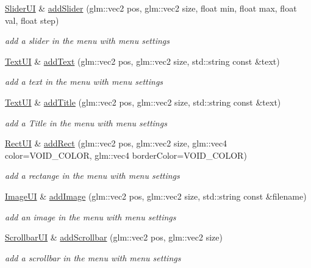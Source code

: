 \begin{DoxyCompactItemize}
\hyperlink{class_slider_u_i}{Slider\+UI} \& \hyperlink{class_a_scene_menu_ad526697a433c9f8e627eb6c147a5bd20}{add\+Slider} (glm\+::vec2 pos, glm\+::vec2 size, float min, float max, float val, float step)
\begin{DoxyCompactList}\small\item\em add a slider in the menu with menu settings \end{DoxyCompactList}\item 
\hyperlink{class_text_u_i}{Text\+UI} \& \hyperlink{class_a_scene_menu_a209b1c4974690a8070835772b3b008b0}{add\+Text} (glm\+::vec2 pos, glm\+::vec2 size, std\+::string const \&text)
\begin{DoxyCompactList}\small\item\em add a text in the menu with menu settings \end{DoxyCompactList}\item 
\hyperlink{class_text_u_i}{Text\+UI} \& \hyperlink{class_a_scene_menu_a35ca98e36b71c2915771a5878ecea077}{add\+Title} (glm\+::vec2 pos, glm\+::vec2 size, std\+::string const \&text)
\begin{DoxyCompactList}\small\item\em add a Title in the menu with menu settings \end{DoxyCompactList}\item 
\hyperlink{class_rect_u_i}{Rect\+UI} \& \hyperlink{class_a_scene_menu_abbada4b933b8b6fa9135a143acc8198d}{add\+Rect} (glm\+::vec2 pos, glm\+::vec2 size, glm\+::vec4 color=V\+O\+I\+D\+\_\+\+C\+O\+L\+OR, glm\+::vec4 border\+Color=V\+O\+I\+D\+\_\+\+C\+O\+L\+OR)
\begin{DoxyCompactList}\small\item\em add a rectange in the menu with menu settings \end{DoxyCompactList}\item 
\hyperlink{class_image_u_i}{Image\+UI} \& \hyperlink{class_a_scene_menu_a4476a757ca150acf6ae85a3e64e65558}{add\+Image} (glm\+::vec2 pos, glm\+::vec2 size, std\+::string const \&filename)
\begin{DoxyCompactList}\small\item\em add an image in the menu with menu settings \end{DoxyCompactList}\item 
\hyperlink{class_scrollbar_u_i}{Scrollbar\+UI} \& \hyperlink{class_a_scene_menu_a9330a0a513fc803057b8b6fb65bfd954}{add\+Scrollbar} (glm\+::vec2 pos, glm\+::vec2 size)
\begin{DoxyCompactList}\small\item\em add a scrollbar in the menu with menu settings \end{DoxyCompactList}\item 

\end{DoxyCompactItemize}
